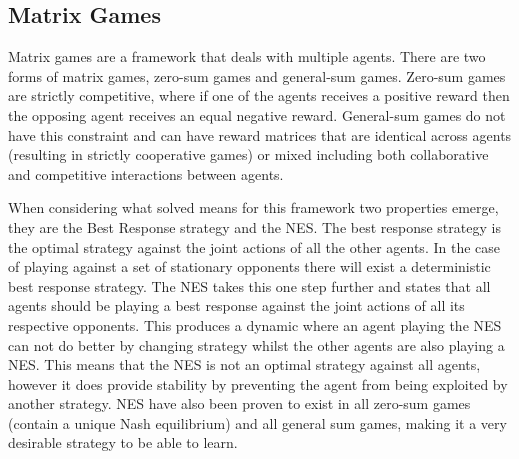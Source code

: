 \documentclass[conference]{IEEEtran}
\begin{document}
\subsection{Matrix Games}
Matrix games are a framework that deals with multiple agents\cite{basar1999dynamic}. There are two forms of matrix games, zero-sum games and general-sum games. Zero-sum games are strictly competitive, where if one of the agents receives a positive reward then the opposing agent receives an equal negative reward. General-sum games do not have this constraint and can have reward matrices that are identical across agents (resulting in strictly cooperative games) or mixed including both collaborative and competitive interactions between agents.

When considering what solved means for this framework two properties emerge, they are the Best Response strategy and the NES\cite{basar1999dynamic}. The best response strategy is the optimal strategy against the joint actions of all the other agents. In the case of playing against a set of stationary opponents there will exist a deterministic best response strategy. The NES takes this one step further and states that all agents should be playing a best response against the joint actions of all its respective opponents. This produces a dynamic where an agent playing the NES can not do better by changing strategy whilst the other agents are also playing a NES. This means that the NES is not an optimal strategy against all agents, however it does provide stability by preventing the agent from being exploited by another strategy. NES have also been proven to exist in all zero-sum games (contain a unique Nash equilibrium) and all general sum games, making it a very desirable strategy to be able to learn.
\end{document}

